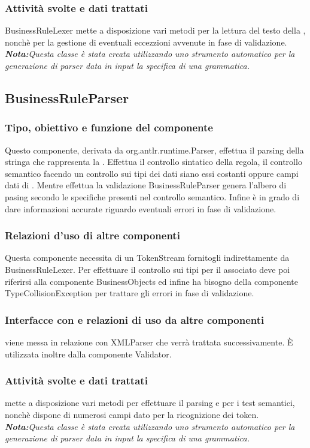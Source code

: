 \documentclass[11pt,titlepage,a4paper]{report}
\begin{document}
\subsubsection{Attivit\`a svolte e dati trattati}
BusinessRuleLexer mette a disposizione vari metodi per la lettura del testo della \br, nonch\`e per la gestione di eventuali eccezzioni avvenute in fase di validazione.
\textit{\textbf{Nota:}Questa classe \`e stata creata utilizzando uno strumento automatico per la generazione di parser data in input la specifica di una grammatica.}

\subsection{BusinessRuleParser}
\subsubsection{Tipo, obiettivo e funzione del componente}
Questo componente, derivata da org.antlr.runtime.Parser, effettua il parsing della stringa che rappresenta la \br. Effettua il controllo sintatico della regola, il controllo semantico facendo un controllo sui tipi dei dati siano essi costanti oppure campi dati di \bos. Mentre effettua la validazione BusinessRuleParser genera l'albero di pasing secondo le specifiche presenti nel controllo semantico. Infine \`e in grado di dare informazioni accurate 
riguardo eventuali errori in fase di validazione.
\subsubsection{Relazioni d'uso di altre componenti}
Questa componente necessita di un TokenStream fornitogli indirettamente da BusinessRuleLexer. Per effettuare il controllo sui tipi per il \bo associato deve poi riferirsi alla componente BusinessObjects ed infine ha bisogno della componente TypeCollisionException per trattare gli errori in fase di validazione.
\subsubsection{Interfacce con e relazioni di uso da altre componenti}
\brp viene messa in relazione con XMLParser che verr\`a trattata successivamente.
\`E utilizzata inoltre dalla componente Validator.
\subsubsection{Attivit\`a svolte e dati trattati}
\brp mette a disposizione vari metodi per effettuare il parsing e per i test semantici, nonch\`e dispone di numerosi campi dato per la ricognizione dei token.
\textit{\textbf{Nota:}Questa classe \`e stata creata utilizzando uno strumento automatico per la generazione di parser data in input la specifica di una grammatica.}
\end{document}
